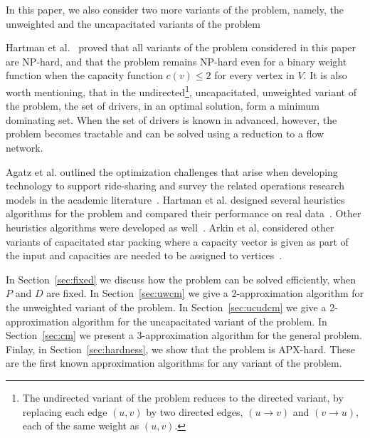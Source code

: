 In this paper, we also consider two more variants of the problem, namely, 
the unweighted and the uncapacitated variants of the problem 
  
Hartman et al.~\cite{hartman2013optimal} proved that all variants of the
\emph{\CARPOOL{}} problem considered in this paper are NP-hard,
and that the problem remains NP-hard even for a binary weight function when
the capacity function $c(v) \leq 2$ for every vertex in $V$.
It is also worth mentioning, that in the undirected\footnote{
The undirected variant of the problem reduces to the directed variant,
by replacing each edge $(u,v)$ by two directed edges,
$(u \rightarrow v)$ and $(v \rightarrow u)$,
each of the same weight as $(u,v)$.}, uncapacitated, unweighted
variant of the problem, the set of drivers, in an optimal solution,
form a minimum dominating set.
When the set of drivers is known in advanced, however, the problem becomes
tractable and can be solved using a reduction to a flow network.

Agatz et al. outlined the optimization challenges that arise 
when developing technology to support ride-sharing and survey the
related operations research models in the academic literature~\cite{agatz2012optimization}.  
Hartman et al. designed several heuristics algorithms for the 
\CARPOOL{} problem and compared 
their performance on real data~\cite{hartman2014theory}.
Other heuristics algorithms were developed as well~\cite{knapen2014exploiting}.
Arkin et al, considered other variants of capacitated star packing where
a capacity vector is given as part of the input and 
capacities are needed to be assigned to vertices~\cite{arkin2004approximations}.  


In Section~\ref{sec:fixed} we discuss how the problem can be solved efficiently,
when $P$ and $D$ are fixed.
In Section~\ref{sec:uwcm} we give a 2-approximation algorithm for the
unweighted variant of the problem.
In Section~\ref{sec:ucudcm} we give a 2-approximation algorithm
for the uncapacitated variant of the problem. 
In Section~\ref{sec:cm} we present a 3-approximation
algorithm for the general problem. 
Finlay, in Section~\ref{sec:hardness}, we show that the problem is APX-hard.
These are the first known approximation algorithms for any variant of the problem.
